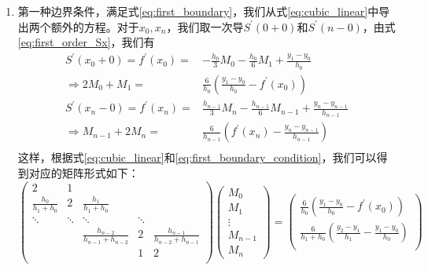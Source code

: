 	\begin{enumerate}
		\item 第一种边界条件，满足式\eqref{eq:first_boundary}，我们从式\eqref{eq:cubic_linear}中导出两个额外的方程。对于$x_0, x_n$，我们取一次导$S^{\prime}(0+0)$和$S^{\prime}(n-0)$，由式\eqref{eq:first_order_Sx}，我们有
			\begin{equation}
				\begin{aligned}
					S^{\prime}(x_0+0) = f^{\prime}(x_0) =& - \frac{h_0}{3}M_0 - \frac{h_0}{6}M_{1} + \frac{y_{1} - y_0}{h_0}	\\
					\Rightarrow 
					2M_0 + M_1 =& \frac{6}{h_0} \left( \frac{y_1 - y_0}{h_0} - f^{\prime}(x_0) \right)	\\
					S^{\prime}(x_n-0) = f^{\prime}(x_n) =& \frac{h_{n-1}}{3}M_n - \frac{h_{n-1}}{6}M_{n-1} + \frac{y_{n} - y_{n-1}}{h_{n-1}}	\\
					\Rightarrow 
					M_{n-1} + 2M_n =& \frac{6}{h_{n-1}} \left( f^{\prime}(x_{n}) - \frac{y_{n} - y_{n-1}}{h_{n-1}} \right)	\\
				\end{aligned}
				\label{eq:first_boundary_condition}
			\end{equation} 
			这样，根据式\eqref{eq:cubic_linear}和\eqref{eq:first_boundary_condition}，我们可以得到对应的矩阵形式如下：
			\begin{equation}
			    \begin{pmatrix}
					2						&	1	&	~						&	~	&	~\\
					\frac{h_0}{h_1 + h_{0}}	&	2	&	\frac{h_1}{h_1 + h_0}	&	~	&	~\\
					\ddots	&	\ddots		&	\ddots	&	\ddots	&	~\\
					~		&	~			&	\frac{h_{n-2}}{h_{n-1}+h_{n-2}}	&	2	&	\frac{h_{n-1}}{h_{n-2} + h_{n-1}}\\
					~		&	~			&	~	&	1	&	2\\
			    \end{pmatrix}
				\begin{pmatrix}
					M_0		\\
					M_1		\\	
					\vdots	\\
					M_{n-1}	\\
					M_{n}	
				\end{pmatrix}
				=
				\begin{pmatrix}
					\frac{6}{h_0}\left(\frac{y_1-y_0}{h_0} - f^{\prime}(x_0)\right)	\\
					\frac{6}{h_1 + h_0}\left(\frac{y_2-y_1}{h_1} - \frac{y_1 - y_0}{h_{0}}\right)	\\

\end{pmatrix}
\end{equation}
\end{enumerate}
